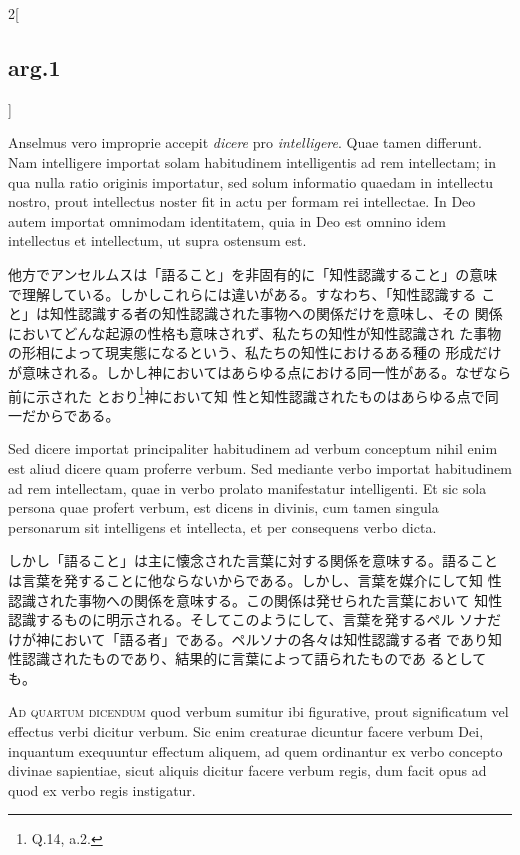 \documentclass[paper=a4paper,fontsize=10pt,jafontsize=9pt,titlepage]{jlreq}
\begin{document}
\begin{paracol}{2}[\subsection{arg.1}]
\switchcolumn*

Anselmus
 vero improprie accepit {\itshape dicere} pro {\itshape intelligere}. 
Quae tamen
 differunt. Nam intelligere importat solam habitudinem intelligentis
 ad rem intellectam; in qua nulla ratio originis importatur, sed solum
 informatio quaedam in intellectu nostro, prout intellectus noster fit
 in actu per formam rei intellectae. In Deo autem importat omnimodam
 identitatem, quia in Deo est omnino idem intellectus et intellectum,
 ut supra ostensum est.

\switchcolumn

他方でアンセルムスは「語ること」を非固有的に「知性認識すること」の意味
 で理解している。しかしこれらには違いがある。すなわち、「知性認識する
 こと」は知性認識する者の知性認識された事物への関係だけを意味し、その
 関係においてどんな起源の性格も意味されず、私たちの知性が知性認識され
 た事物の形相によって現実態になるという、私たちの知性におけるある種の
 形成だけが意味される。しかし神においてはあらゆる点における同一性がある。なぜなら前に示された
 とおり\footnote{Q.14, a.2.}神において知
 性と知性認識されたものはあらゆる点で同一だからである。

\switchcolumn*

Sed dicere importat principaliter habitudinem
 ad verbum conceptum nihil enim est aliud dicere quam proferre
 verbum. 
Sed mediante verbo importat habitudinem ad rem intellectam,
 quae in verbo prolato manifestatur intelligenti. Et sic sola persona
 quae profert verbum, est dicens in divinis, cum tamen singula
 personarum sit intelligens et intellecta, et per consequens verbo
 dicta.

\switchcolumn

しかし「語ること」は主に懐念された言葉に対する関係を意味する。語ること
 は言葉を発することに他ならないからである。しかし、言葉を媒介にして知
 性認識された事物への関係を意味する。この関係は発せられた言葉において
 知性認識するものに明示される。そしてこのようにして、言葉を発するペル
 ソナだけが神において「語る者」である。ペルソナの各々は知性認識する者
 であり知性認識されたものであり、結果的に言葉によって語られたものであ
 るとしても。

\switchcolumn*[\subsection{ad.4}]

{\scshape Ad quartum dicendum} quod verbum sumitur ibi figurative, prout
 significatum vel effectus verbi dicitur verbum. Sic enim creaturae
 dicuntur facere verbum Dei, inquantum exequuntur effectum aliquem, ad
 quem ordinantur ex verbo concepto divinae sapientiae, sicut aliquis
 dicitur facere verbum regis, dum facit opus ad quod ex verbo regis
 instigatur.


\end{paracol}
\end{document}
